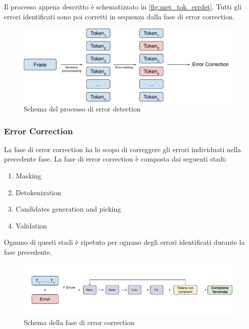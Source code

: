 Il processo appena descritto è schematizzato in \autoref{fig:met_tok_errdet}. Tutti gli errori identificati sono poi corretti in sequenza dalla fase di error correction. 

\begin{figure}[H]
\centering
\includegraphics[width=\textwidth]{immagini/metodologia/error_detection}
\caption{Schema del processo di error detection}
\label{fig:met_tok_errdet}
\end{figure}

\subsubsection{Error Correction}
\label{sec:met_errcor}

La fase di error correction ha lo scopo di correggere gli errori individuati nella precedente fase. La fase di error correction è composta dai seguenti stadi:

\begin{enumerate}
\item Masking
\item Detokenization
\item Candidates generation and picking
\item Validation
\end{enumerate}

Ognuno di questi stadi è ripetuto per ognuno degli errori identificati durante la fase precedente.

\begin{figure}[H]
\centering
\includegraphics[width=\textwidth]{immagini/metodologia/tok_correction}
\caption{Schema della fase di error correction}
\label{fig:met_tok_correction}
\end{figure}



